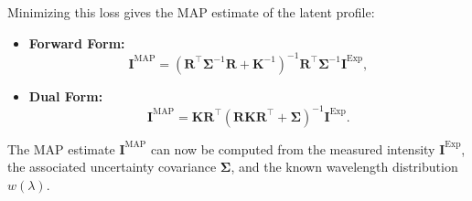 \documentclass[12pt]{article}
\begin{document}
Minimizing this loss gives the MAP estimate of the latent profile:

\begin{itemize}
    \item \textbf{Forward Form:}
    \begin{equation}
        \mathbf{I}^{\mathrm{MAP}} = \left( \mathbf{R}^\top \boldsymbol{\Sigma}^{-1} \mathbf{R} + \mathbf{K}^{-1} \right)^{-1} \mathbf{R}^\top \boldsymbol{\Sigma}^{-1} \mathbf{I}^{\mathrm{Exp}},
    \end{equation}

    \item \textbf{Dual Form:}
    \begin{equation}
        \mathbf{I}^{\mathrm{MAP}} = \mathbf{K} \mathbf{R}^\top \left( \mathbf{R} \mathbf{K} \mathbf{R}^\top + \boldsymbol{\Sigma} \right)^{-1} \mathbf{I}^{\mathrm{Exp}}.
    \end{equation}
\end{itemize}

The MAP estimate \( \mathbf{I}^{\mathrm{MAP}} \) can now be computed from the measured intensity \( \mathbf{I}^{\mathrm{Exp}} \), the associated uncertainty covariance \( \boldsymbol{\Sigma} \), and the known wavelength distribution \( w(\lambda) \).

\end{document}

